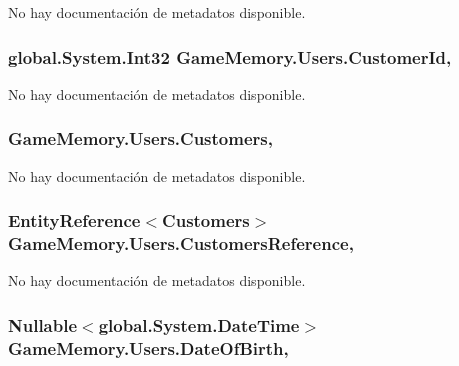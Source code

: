 No hay documentación de metadatos disponible. 

\hypertarget{class_game_memory_1_1_users_a7374f9d0dc506d2044098f621fd5397a}{
\subsubsection[{Customer\-Id}]{\setlength{\rightskip}{0pt plus 5cm}global.\-System.\-Int32 Game\-Memory.\-Users.\-Customer\-Id\hspace{0.3cm}{\ttfamily [get]}, {\ttfamily [set]}}}\label{class_game_memory_1_1_users_a7374f9d0dc506d2044098f621fd5397a}


No hay documentación de metadatos disponible. 

\hypertarget{class_game_memory_1_1_users_aa00fe3516ae95f465ff77d338217736a}{
\subsubsection[{Customers}]{ Game\-Memory.\-Users.\-Customers\hspace{0.3cm}{\ttfamily [get]}, {\ttfamily [set]}}}\label{class_game_memory_1_1_users_aa00fe3516ae95f465ff77d338217736a}


No hay documentación de metadatos disponible. 

\hypertarget{class_game_memory_1_1_users_ade92ef696dff98620ce322dedfcd7b52}{
\subsubsection[{Customers\-Reference}]{\setlength{\rightskip}{0pt plus 5cm}Entity\-Reference$<${\bf Customers}$>$ Game\-Memory.\-Users.\-Customers\-Reference\hspace{0.3cm}{\ttfamily [get]}, {\ttfamily [set]}}}\label{class_game_memory_1_1_users_ade92ef696dff98620ce322dedfcd7b52}


No hay documentación de metadatos disponible. 

\hypertarget{class_game_memory_1_1_users_a7c3fd7829e1bcff44f1ddf93163c7a7e}{
\subsubsection[{Date\-Of\-Birth}]{\setlength{\rightskip}{0pt plus 5cm}Nullable$<$global.\-System.\-Date\-Time$>$ Game\-Memory.\-Users.\-Date\-Of\-Birth\hspace{0.3cm}{\ttfamily [get]}, {\ttfamily [set]}}}\label{class_game_memory_1_1_users_a7c3fd7829e1bcff44f1ddf93163c7a7e}


